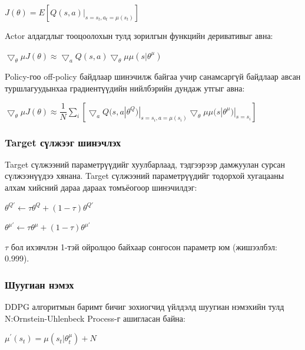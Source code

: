 \documentclass[12pt,A4]{report}
\begin{document}
\begin{center}
$J(\theta) = E[Q(s, a)|_{s=s_t,a_t=\mu(s_t)}]$
\end{center}

Actor алдагдлыг тооцоолохын тулд зорилгын функцийн деривативыг авна:

\begin{center}
$\bigtriangledown_\theta\mu J(\theta) \approx \bigtriangledown_a Q(s, a)\bigtriangledown_\theta\mu \mu(s|\theta^\mu)$
\end{center}

Policy-гоо off-policy байдлаар шинэчилж байгаа учир санамсаргүй байдлаар авсан туршлагуудынхаа градиентүүдийн нийлбэрийн дундаж утгыг авна:

\begin{center}
$\bigtriangledown_\theta\mu J(\theta) \approx \dfrac{1}{N} \sum_{i}[\bigtriangledown_a Q(s, a|\theta^Q)|_{s=s_i,a=\mu(s_i)}\bigtriangledown_\theta\mu \mu(s|\theta^\mu)|_{s=s_i}]$
\end{center}

\subsubsection{Target сүлжээг шинэчлэх}
 
Target сүлжээний параметрүүдийг хуулбарлаад, тэдгээрээр дамжуулан сурсан сүлжээнүүдээ хянана. Target сүлжээний параметрүүдийг тодорхой хугацааны алхам хийсний дараа дараах томъёогоор шинэчилдэг:

\begin{center}
$\theta^{Q{'}} \longleftarrow \tau\theta^Q + (1-\tau)\theta^{Q{'}}$ 

$\theta^{\mu{'}} \longleftarrow \tau\theta^\mu + (1-\tau)\theta^{\mu{'}}$ 

$\tau $ бол ихэвчлэн 1-тэй ойролцоо байхаар сонгосон параметр юм (жишээлбэл: 0.999).
\end{center}

\subsubsection{Шуугиан нэмэх}

DDPG алгоритмын баримт бичиг зохиогчид үйлдэлд шуугиан нэмэхийн тулд N:Ornstein-Uhlenbeck Process-г ашигласан байна:

\begin{center}
$\mu^{'}(s_t) = \mu(s_t|\theta_t^\mu) + N$
\end{center}
\end{document}
